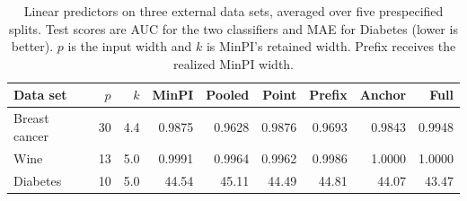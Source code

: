 \begin{table}[tb]
\centering
\caption{Linear predictors on three external data sets, averaged over five prespecified splits. Test scores are AUC for the two classifiers and MAE for Diabetes (lower is better). $p$ is the input width and $k$ is MinPI's retained width. Prefix receives the realized MinPI width.}
\label{tab:transfer}
\small
\begin{tabular}{@{}lrrrrrrrr@{}}
\toprule
Data set & $p$ & $k$ & MinPI & Pooled & Point & Prefix & Anchor & Full \\
\midrule
Breast cancer & 30 & 4.4 & 0.9875 & 0.9628 & 0.9876 & 0.9693 & 0.9843 & 0.9948 \\
Wine & 13 & 5.0 & 0.9991 & 0.9964 & 0.9962 & 0.9986 & 1.0000 & 1.0000 \\
Diabetes & 10 & 5.0 & 44.54 & 45.11 & 44.49 & 44.81 & 44.07 & 43.47 \\
\bottomrule
\end{tabular}
\end{table}
